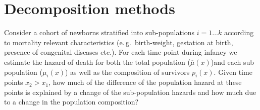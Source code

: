 \documentclass[12pt, parskip=half]{scrartcl}
\begin{document}


\section{Decomposition methods}

Consider a cohort of newborns stratified into sub-populations $i=1\ldots k$ according to mortality relevant characteristics (e.\,g.~birth-weight, gestation at birth, presence of congenital diseases etc.). For each time-point during infancy we estimate the hazard of death for both the total population ($\overbar{\mu}(x)$)and each sub population ($\mu_i(x)$) as well as the composition of survivors $p_i(x)$. Given time points $x_2 > x_1$, how much of the difference of the population hazard at these points is explained by a change of the sub-population hazards and how much due to a change in the population composition?
\end{document}
